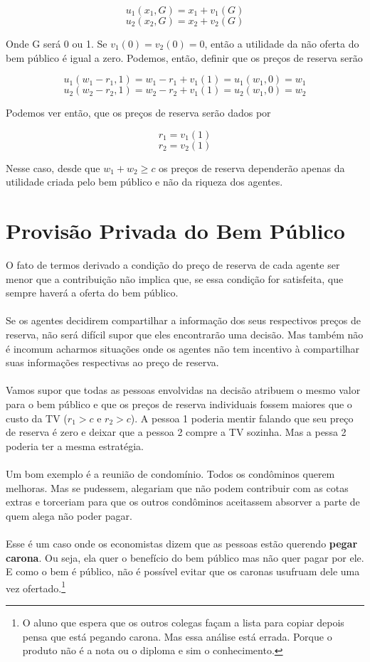 \documentclass[a4paper,11pt,oneside]{book}
\theoremstyle{definition}
\theoremstyle{break}
\begin{document}
$$u_1(x_1,G) = x_1 + v_1(G)$$
$$u_2(x_2,G) = x_2 + v_2(G)$$

Onde G será 0 ou 1. Se $v_1(0) = v_2(0) = 0$, então a utilidade da não oferta do bem público é igual a zero. Podemos, então, definir que os preços de reserva serão

$$u_1(w_1 - r_1,1) = w_1 - r_1 + v_1(1) = u_1(w_1,0) = w_1$$
$$u_2(w_2 - r_2,1) = w_2 - r_2 + v_1(1) = u_2(w_1,0) = w_2$$

Podemos ver então, que os preços de reserva serão dados por

$$r_1 = v_1(1)$$
$$r_2 = v_2(1)$$

Nesse caso, desde que $w_1 + w_2 \geq c$ os preços de reserva dependerão apenas da utilidade criada pelo bem público e não da riqueza dos agentes.

\section{Provisão Privada do Bem Público}

O fato de termos derivado a condição do preço de reserva de cada agente ser menor que a contribuição não implica que, se essa condição for satisfeita, que sempre haverá a oferta do bem público.
\\~\\
Se os agentes decidirem compartilhar a informação dos seus respectivos preços de reserva, não será difícil supor que eles encontrarão uma decisão. Mas também não é incomum acharmos situações onde os agentes não tem incentivo à compartilhar suas informações respectivas ao preço de reserva.
\\~\\
Vamos supor que todas as pessoas envolvidas na decisão atribuem o mesmo valor para o bem público e que os preços de reserva individuais fossem maiores que o custo da TV ($r_1 > c$ e $r_2 > c$). A pessoa 1 poderia mentir falando que seu preço de reserva é zero e deixar que a pessoa 2 compre a TV sozinha. Mas a pessa 2 poderia ter a mesma estratégia.
\\~\\
Um bom exemplo é a reunião de condomínio. Todos os condôminos querem melhoras. Mas se pudessem, alegariam que não podem contribuir com as cotas extras e torceriam para que os outros condôminos aceitassem absorver a parte de quem alega não poder pagar.
\\~\\
Esse é um caso onde os economistas dizem que as pessoas estão querendo \textbf{pegar carona}. Ou seja, ela quer o benefício do bem público mas não quer pagar por ele. E como o bem é público, não é possível evitar que os caronas usufruam dele uma vez ofertado.\footnote{O aluno que espera que os outros colegas façam a lista para copiar depois pensa que está pegando carona. Mas essa análise está errada. Porque o produto não é a nota ou o diploma e sim o conhecimento.}
\end{document}
